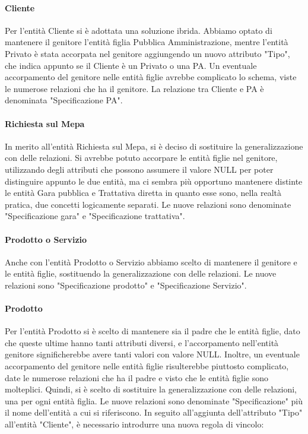 \paragraph{Cliente}
Per l'entità Cliente si è adottata una soluzione ibrida. Abbiamo optato di mantenere il genitore l'entità figlia Pubblica Amministrazione, mentre l'entità Privato è stata accorpata nel genitore aggiungendo un nuovo attributo "Tipo", che indica appunto se il Cliente è un Privato o una PA. Un eventuale accorpamento del genitore nelle entità figlie avrebbe complicato lo schema, viste le numerose relazioni che ha il genitore.
\newline
La relazione tra Cliente e PA è denominata "Specificazione PA".
\paragraph{Richiesta sul Mepa}
In merito all'entità Richiesta sul Mepa, si è deciso di sostituire la generalizzazione con delle relazioni. Si avrebbe potuto accorpare le entità figlie nel genitore, utilizzando degli attributi che possono assumere il valore NULL per poter distinguire appunto le due entità, ma ci sembra più opportuno mantenere distinte le entità Gara pubblica e Trattativa diretta in quanto esse sono, nella realtà pratica, due concetti logicamente separati.
Le nuove relazioni sono denominate "Specificazione gara" e "Specificazione trattativa".
\paragraph{Prodotto o Servizio}
Anche con l'entità Prodotto o Servizio abbiamo scelto di mantenere il genitore e le entità figlie, sostituendo la generalizzazione con delle relazioni. Le nuove relazioni sono "Specificazione prodotto" e "Specificazione Servizio".
\paragraph{Prodotto}
Per l'entità Prodotto si è scelto di mantenere sia il padre che le entità figlie, dato che queste ultime hanno tanti attributi diversi, e l'accorpamento nell'entità genitore significherebbe avere tanti valori con valore NULL. Inoltre, un eventuale accorpamento del genitore nelle entità figlie risulterebbe piuttosto complicato, date le numerose relazioni che ha il padre e visto che le entità figlie sono molteplici.
Quindi, si è scelto di sostituire la generalizzazione con delle relazioni, una per ogni entità figlia. Le nuove relazioni sono denominate "Specificazione" più il nome dell'entità a cui si riferiscono.
\newline\newline
In seguito all'aggiunta dell'attributo "Tipo" all'entità "Cliente", è necessario introdurre una nuova regola di vincolo:

